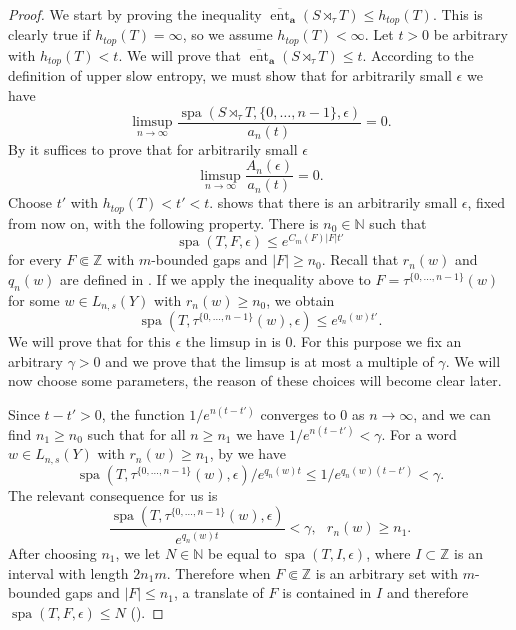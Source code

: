 \documentclass[10pt,a4paper]{amsart}
\newcommand{\N}{\mathbb{N}}
\newcommand{\Z}{\mathbb{Z}}
\newcommand{\spa}{\operatorname{spa}}
\newcommand{\upperent}{\overline{\operatorname{ent}}}
\begin{document}
\begin{proof}
    We start by proving the inequality $
    \upperent_{\textbf{a}}(S\rtimes_\tau T)\leq h_{top}(T)$. This is clearly true if $h_{top}(T)=\infty$, so we assume $h_{top}(T)<\infty$. Let $t>0$ be arbitrary with $h_{top}(T)<t$. We will prove that $\upperent_{\textbf{a}}(S\rtimes_\tau T)\leq t$. According to the definition of upper slow entropy, we must show that for arbitrarily small $\epsilon$ we have
    \[\limsup_{n\to\infty} \frac{\spa(S\rtimes_\tau T,\{0,\dots,n-1\},\epsilon)}{a_n(t)}=0.\]
    By  it suffices to prove that for arbitrarily small $\epsilon$
    \begin{equation}\label{eq:limsup}\limsup_{n\to\infty} \frac{A_n(\epsilon)}{a_n(t)}=0.\end{equation}
    Choose $t'$ with $h_{top}(T)<t'<t$.  shows that there is an arbitrarily small $\epsilon$, fixed from now on, with the following property. There is $n_0\in\N$ such that \[\spa(T,F,\epsilon)\leq e^{C_m(F)|F|t'}\]
    for every $F\Subset\Z$ with $m$-bounded gaps and $|F|\geq n_0$. Recall that $r_n(w)$ and $q_n(w)$ are defined in . If we apply the inequality above to $F=\tau^{\{0,\dots,n-1\}}(w)$ for some $w\in L_{n,s}(Y)$ with $r_n(w)\geq n_0$, we obtain
    \begin{equation}\label{eq:estimate-1} \spa(T,\tau^{\{0,\dots,n-1\}}(w),\epsilon)\leq e^{q_n(w)t'}.\end{equation}
    We will prove that for this $\epsilon$ the limsup in  is 0. For this purpose we fix an arbitrary $\gamma>0$ and we prove that the limsup is at most a multiple of $\gamma$. We will now choose some parameters, the reason of these choices will become clear later. 
    
    Since $t-t'>0$, the function $1/e^{n(t-t')}$ converges to $0$ as $n\to\infty$, and we can find $n_1\geq n_0$ such that for all $n\geq n_1$ we have $1/e^{n(t-t')}<\gamma$. For a word $w\in L_{n,s}(Y)$ with $r_n(w)\geq n_1$, by  we have \[\spa(T,\tau^{\{0,\dots,n-1\}}(w),\epsilon)/e^{q_n(w)t}\leq 1/{e^{q_n(w)(t-t')}}<\gamma.\] The relevant consequence for us is 
    \begin{equation}\label{n1-definition}
    \frac{\spa(T,\tau^{\{0,\dots,n-1\}}(w),\epsilon)}{e^{q_n(w)t}}<\gamma, \ \ \ r_n(w)\geq n_1.
    \end{equation}
    After choosing $n_1$, we let $N\in\N$ be equal to $\spa(T,I,\epsilon)$, where $I\subset\Z$ is an interval with length $2n_1m$. Therefore when  $F\Subset\Z$ is an arbitrary set with $m$-bounded gaps and $|F|\leq n_1$, a translate of $F$ is contained in $I$ and therefore $\spa(T,F,\epsilon)\leq N$ ().  
    

\end{proof}
\end{document}
